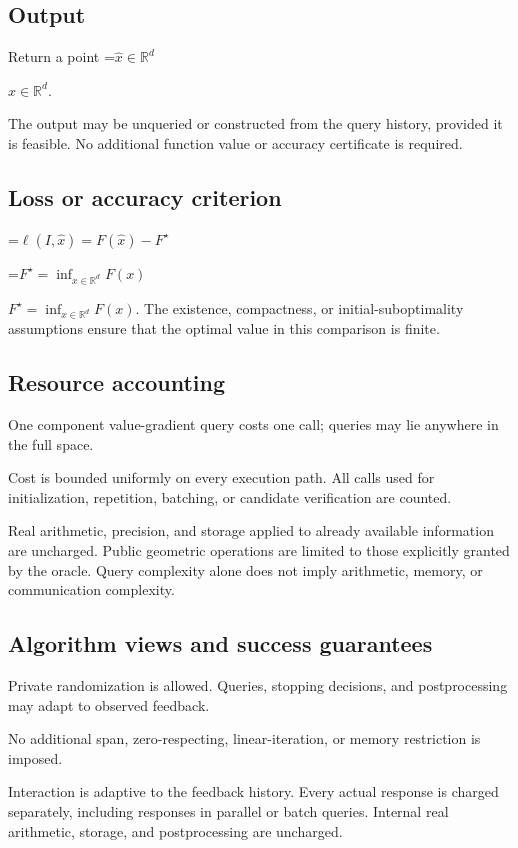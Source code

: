 \documentclass[10pt,a4paper]{article}
\newcommand{\AtlasMath}[1]{\par\begingroup\centering\setbox0=\hbox{$\displaystyle #1$}\ifdim\wd0>1.4\linewidth\typeout{ATLAS WIDE FORMULA: \the\wd0}\fi\ifdim\wd0>\linewidth\resizebox{\linewidth}{!}{\box0}\else\box0\fi\par\endgroup}
\newcommand{\AtlasInlineMath}[1]{\begingroup\setbox0=\hbox{$#1$}\ifdim\wd0>.4\linewidth\endgroup\AtlasMath{#1}\else\endgroup$#1$\fi}
\begin{document}
\subsection{Output}
Return a point \AtlasInlineMath{\widehat x\in\mathbb R^d}.

The output may be unqueried or constructed from the query history, provided it is feasible. No additional function value or accuracy certificate is required.

\subsection{Loss or accuracy criterion}

\AtlasMath{\ell(I,\widehat{x})=F(\widehat{x})-F^\star}


\AtlasInlineMath{F^\star=\inf_{x\in \mathbb{R}^d}F(x)}. The existence, compactness, or initial-suboptimality assumptions ensure that the optimal value in this comparison is finite.

\subsection{Resource accounting}
One component value-gradient query costs one call; queries may lie anywhere in the full space.

Cost is bounded uniformly on every execution path. All calls used for initialization, repetition, batching, or candidate verification are counted.

Real arithmetic, precision, and storage applied to already available information are uncharged. Public geometric operations are limited to those explicitly granted by the oracle. Query complexity alone does not imply arithmetic, memory, or communication complexity.

\subsection{Algorithm views and success guarantees}
Private randomization is allowed. Queries, stopping decisions, and postprocessing may adapt to observed feedback.

No additional span, zero-respecting, linear-iteration, or memory restriction is imposed.

Interaction is adaptive to the feedback history. Every actual response is charged separately, including responses in parallel or batch queries. Internal real arithmetic, storage, and postprocessing are uncharged.
\end{document}
